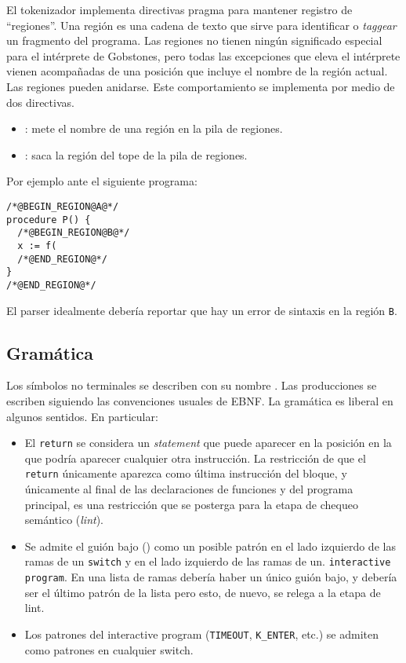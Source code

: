 \documentclass{article}
\begin{document}
El tokenizador implementa directivas pragma para
mantener registro de ``regiones''. Una regi\'on es una cadena de texto que
sirve para identificar o {\em taggear} un fragmento del programa.
Las regiones no tienen ning\'un significado
especial para el int\'erprete de Gobstones, pero todas las excepciones que
eleva el int\'erprete vienen acompa\~nadas de una posici\'on que incluye
el nombre de la regi\'on actual. Las regiones pueden anidarse.
Este comportamiento se implementa por medio de dos directivas.
\begin{itemize}
\item {}:
       mete el nombre de una regi\'on en la pila de regiones.
\item {}: saca la regi\'on del tope de la pila de regiones.
\end{itemize}
Por ejemplo ante el siguiente programa:
\begin{verbatim}
/*@BEGIN_REGION@A@*/
procedure P() {
  /*@BEGIN_REGION@B@*/
  x := f(
  /*@END_REGION@*/
}
/*@END_REGION@*/
\end{verbatim}
El parser idealmente deber\'ia reportar que hay un error de sintaxis en la regi\'on \texttt{B}.

\subsection{Gram\'atica}
Los s\'imbolos no terminales se describen con su nombre .
Las producciones se escriben siguiendo las convenciones usuales de EBNF.
La gram\'atica es liberal en algunos sentidos. En particular:
\begin{itemize}
\item El \texttt{return}
se considera un {\em statement} que puede aparecer en la posici\'on en la que
podr\'ia aparecer cualquier otra instrucci\'on. La restricci\'on de que
el \texttt{return} \'unicamente aparezca como \'ultima instrucci\'on del bloque, y
\'unicamente al final de las declaraciones de funciones y del programa principal,
es una restricci\'on que se posterga para la etapa de chequeo sem\'antico
({\em lint}).
\item Se admite el gui\'on bajo (\chr{\_}) como un posible patr\'on en el lado
izquierdo de las ramas de un \texttt{switch} y en el lado izquierdo de las ramas de un.
\texttt{interactive program}.
En una lista de ramas deber\'ia haber un \'unico gui\'on bajo, y deber\'ia ser el \'ultimo
patr\'on de la lista pero esto, de nuevo, se relega a la etapa de lint.
\item Los patrones del interactive program (\texttt{TIMEOUT}, \texttt{K\_ENTER}, etc.) se
admiten como patrones en cualquier switch.
\end{itemize}
\end{document}
